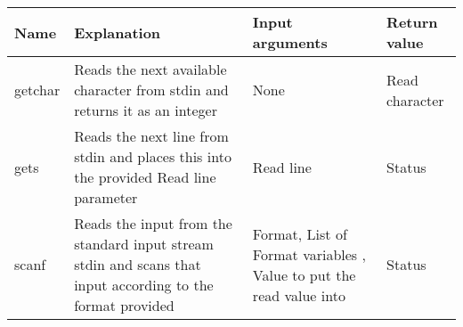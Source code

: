 \begin{longtable}[]{@{}llll@{}}
\toprule
\begin{minipage}[b]{0.11\columnwidth}\raggedright
Name\strut
\end{minipage} & \begin{minipage}[b]{0.23\columnwidth}\raggedright
Explanation\strut
\end{minipage} & \begin{minipage}[b]{0.30\columnwidth}\raggedright
Input arguments\strut
\end{minipage} & \begin{minipage}[b]{0.25\columnwidth}\raggedright
Return value\strut
\end{minipage}\tabularnewline
\midrule
\endhead
\begin{minipage}[t]{0.11\columnwidth}\raggedright
getchar\strut
\end{minipage} & \begin{minipage}[t]{0.23\columnwidth}\raggedright
Reads the next available character from stdin and returns it as an
integer\strut
\end{minipage} & \begin{minipage}[t]{0.30\columnwidth}\raggedright
None\strut
\end{minipage} & \begin{minipage}[t]{0.25\columnwidth}\raggedright
Read character\strut
\end{minipage}\tabularnewline
\begin{minipage}[t]{0.11\columnwidth}\raggedright
gets\strut
\end{minipage} & \begin{minipage}[t]{0.23\columnwidth}\raggedright
Reads the next line from stdin and places this into the provided Read
line parameter\strut
\end{minipage} & \begin{minipage}[t]{0.30\columnwidth}\raggedright
Read line\strut
\end{minipage} & \begin{minipage}[t]{0.25\columnwidth}\raggedright
Status\strut
\end{minipage}\tabularnewline
\begin{minipage}[t]{0.11\columnwidth}\raggedright
scanf\strut
\end{minipage} & \begin{minipage}[t]{0.23\columnwidth}\raggedright
Reads the input from the standard input stream stdin and scans that
input according to the format provided\strut
\end{minipage} & \begin{minipage}[t]{0.30\columnwidth}\raggedright
Format, List of Format variables , Value to put the read value
into\strut
\end{minipage} & \begin{minipage}[t]{0.25\columnwidth}\raggedright
Status\strut
\end{minipage}\tabularnewline
\bottomrule
\end{longtable}


